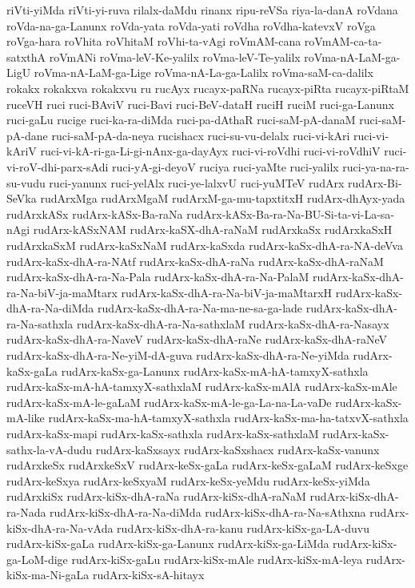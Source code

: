 {riVti-yiMda
riVti-yi-ruva
rilalx-daMdu
rinanx
ripu-reVSa
riya-la-danA
roVdana
roVda-na-ga-Lanunx
roVda-yata
roVda-yati
roVdha
roVdha-katevxV
roVga
roVga-hara
roVhita
roVhitaM
roVhi-ta-vAgi
roVmAM-cana
roVmAM-ca-ta-satxthA
roVmANi
roVma-leV-Ke-yalilx
roVma-leV-Te-yalilx
roVma-nA-LaM-ga-LigU
roVma-nA-LaM-ga-Lige
roVma-nA-La-ga-Lalilx
roVma-saM-ca-dalilx
rokakx
rokakxva
rokakxvu
ru
rucAyx
rucayx-paRNa
rucayx-piRta
rucayx-piRtaM
ruceVH
ruci
ruci-BAviV
ruci-Bavi
ruci-BeV-dataH
ruciH
ruciM
ruci-ga-Lanunx
ruci-gaLu
rucige
ruci-ka-ra-diMda
ruci-pa-dAthaR
ruci-saM-pA-danaM
ruci-saM-pA-dane
ruci-saM-pA-da-neya
rucishacx
ruci-su-vu-delalx
ruci-vi-kAri
ruci-vi-kAriV
ruci-vi-kA-ri-ga-Li-gi-nAnx-ga-dayAyx
ruci-vi-roVdhi
ruci-vi-roVdhiV
ruci-vi-roV-dhi-parx-sAdi
ruci-yA-gi-deyoV
ruciya
ruci-yaMte
ruci-yalilx
ruci-ya-na-ra-su-vudu
ruci-yanunx
ruci-yelAlx
ruci-ye-lalxvU
ruci-yuMTeV
rudArx
rudArx-Bi-SeVka
rudArxMga
rudArxMgaM
rudArxM-ga-mu-tapxtitxH
rudArx-dhAyx-yada
rudArxkASx
rudArx-kASx-Ba-raNa
rudArx-kASx-Ba-ra-Na-BU-Si-ta-vi-La-sa-nAgi
rudArx-kASxNAM
rudArx-kaSX-dhA-raNaM
rudArxkaSx
rudArxkaSxH
rudArxkaSxM
rudArx-kaSxNaM
rudArx-kaSxda
rudArx-kaSx-dhA-ra-NA-deVva
rudArx-kaSx-dhA-ra-NAtf
rudArx-kaSx-dhA-raNa
rudArx-kaSx-dhA-raNaM
rudArx-kaSx-dhA-ra-Na-Pala
rudArx-kaSx-dhA-ra-Na-PalaM
rudArx-kaSx-dhA-ra-Na-biV-ja-maMtarx
rudArx-kaSx-dhA-ra-Na-biV-ja-maMtarxH
rudArx-kaSx-dhA-ra-Na-diMda
rudArx-kaSx-dhA-ra-Na-ma-ne-sa-ga-lade
rudArx-kaSx-dhA-ra-Na-sathxla
rudArx-kaSx-dhA-ra-Na-sathxlaM
rudArx-kaSx-dhA-ra-Nasayx
rudArx-kaSx-dhA-ra-NaveV
rudArx-kaSx-dhA-raNe
rudArx-kaSx-dhA-raNeV
rudArx-kaSx-dhA-ra-Ne-yiM-dA-guva
rudArx-kaSx-dhA-ra-Ne-yiMda
rudArx-kaSx-gaLa
rudArx-kaSx-ga-Lanunx
rudArx-kaSx-mA-hA-tamxyX-sathxla
rudArx-kaSx-mA-hA-tamxyX-sathxlaM
rudArx-kaSx-mAlA
rudArx-kaSx-mAle
rudArx-kaSx-mA-le-gaLaM
rudArx-kaSx-mA-le-ga-La-na-La-vaDe
rudArx-kaSx-mA-like
rudArx-kaSx-ma-hA-tamxyX-sathxla
rudArx-kaSx-ma-ha-tatxvX-sathxla
rudArx-kaSx-mapi
rudArx-kaSx-sathxla
rudArx-kaSx-sathxlaM
rudArx-kaSx-sathx-la-vA-dudu
rudArx-kaSxsayx
rudArx-kaSxshacx
rudArx-kaSx-vanunx
rudArxkeSx
rudArxkeSxV
rudArx-keSx-gaLa
rudArx-keSx-gaLaM
rudArx-keSxge
rudArx-keSxya
rudArx-keSxyaM
rudArx-keSx-yeMdu
rudArx-keSx-yiMda
rudArxkiSx
rudArx-kiSx-dhA-raNa
rudArx-kiSx-dhA-raNaM
rudArx-kiSx-dhA-ra-Nada
rudArx-kiSx-dhA-ra-Na-diMda
rudArx-kiSx-dhA-ra-Na-sAthxna
rudArx-kiSx-dhA-ra-Na-vAda
rudArx-kiSx-dhA-ra-kanu
rudArx-kiSx-ga-LA-duvu
rudArx-kiSx-gaLa
rudArx-kiSx-ga-Lanunx
rudArx-kiSx-ga-LiMda
rudArx-kiSx-ga-LoM-dige
rudArx-kiSx-gaLu
rudArx-kiSx-mAle
rudArx-kiSx-mA-leya
rudArx-kiSx-ma-Ni-gaLa
rudArx-kiSx-sA-hitayx
}
